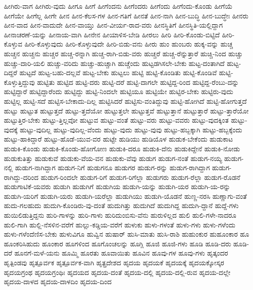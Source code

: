 {ಹೀಗಿರು-ವಾಗ
ಹೀಗಿರು-ವುದು
ಹೀಗೂ
ಹೀಗೆ
ಹೀಗೆಂದನು
ಹೀಗೆಂದರು
ಹೀಗೆಂದು
ಹೀಗೆಂದು-ಕೊಂಡು
ಹೀಗೆಯೆ
ಹೀಗೆಯೇ
ಹೀಗೆಲ್ಲ
ಹೀಗೇ
ಹೀನ
ಹೀನ-ಕೆಲಸ-ಗಳ
ಹೀನ-ಗತಿಗೆ
ಹೀನತೆ
ಹೀನ-ನಾಗಿ
ಹೀನ-ಬುದ್ಧಿ
ಹೀನ-ಬುದ್ಧೇಃ
ಹೀನರು
ಹೀನ-ವಾದ
ಹೀನ-ವಾದುದೇ
ಹೀನ-ವಾಯ್ತು
ಹೀನ-ವೀರ್ಯ-ರಾದ-ವರು
ಹೀನಸ್ಥಿತಿಗೆ
ಹೀನಸ್ಥಿತಿ-ಯಲ್ಲಿದ್ದಾಗ
ಹೀನಾಚರಣೆ-ಯನ್ನು
ಹೀನಾಯ-ವಾಗಿ
ಹೀನೇನ
ಹೀಯಾಳಿಸ-ಬೇಡಿ
ಹೀರಲು
ಹೀರಿ
ಹೀರಿ-ಕೊಂಡು-ಬಿಟ್ಟಿದೆ
ಹೀರಿ-ಕೊಳ್ಳುವ
ಹೀರಿ-ಕೊಳ್ಳುವುದು
ಹೀರಿ-ಕೊಳ್ಳುವುದೇ
ಹೀರಿ-ಬಿಡು-ವನು
ಹೀರು
ಹುಂ
ಹುಂಬರು
ಹುಕ್ಕ-ವನ್ನು
ಹುಚ್ಚ
ಹುಚ್ಚನ
ಹುಚ್ಚನು
ಹುಚ್ಚರ
ಹುಚ್ಚ-ರನ್ನಾಗಿ
ಹುಚ್ಚ-ರಾಗಿ-ಬಿಡು-ವರು
ಹುಚ್ಚರೆ
ಹುಚ್ಚ-ರೆನ್ನುತ್ತಾರೆ
ಹುಚ್ಚಿ-ನಿಂದ
ಹುಚ್ಚು
ಹುಚ್ಚು-ದಾರಿ-ಯಲಿ
ಹುಚ್ಚು-ವರಿದು
ಹುಚ್ಚು-ಹುಚ್ಚಾಗಿ
ಹುಚ್ಚೆಂದು
ಹುಟ್ಟಡಗಿಸಲೇ-ಬೇಕು
ಹುಟ್ಟ-ದಂತಾಗಿದೆ
ಹುಟ್ಟ-ದಿದ್ದರೆ
ಹುಟ್ಟದೆ
ಹುಟ್ಟ-ಬಹು-ದಲ್ಲವೆ
ಹುಟ್ಟ-ಬೇಕು
ಹುಟ್ಟಲು
ಹುಟ್ಟಿ
ಹುಟ್ಟಿ-ಕೊಂಡಿತು
ಹುಟ್ಟಿ-ಕೊಂಡಿವೆ
ಹುಟ್ಟಿ-ಕೊಳ್ಳುತ್ತಿದ್ದುವು
ಹುಟ್ಟಿತು
ಹುಟ್ಟಿದ
ಹುಟ್ಟಿ-ದರು
ಹುಟ್ಟಿ-ದರೆ
ಹುಟ್ಟಿ-ದಾಗಲೇ
ಹುಟ್ಟಿದ್ದ-ರಿಂದ
ಹುಟ್ಟಿದ್ದ-ರೆಂಬು-ದನ್ನು
ಹುಟ್ಟಿದ್ದಾರೆ
ಹುಟ್ಟಿದ್ದಾರೆಂದು
ಹುಟ್ಟಿದ್ದು
ಹುಟ್ಟಿ-ನಿಂದಲೇ
ಹುಟ್ಟಿಯೂ
ಹುಟ್ಟಿಯೇ
ಹುಟ್ಟಿರ-ಬೇಕು
ಹುಟ್ಟಿರು-ವುದು
ಹುಟ್ಟಿಲ್ಲ
ಹುಟ್ಟಿ-ಸದೆ
ಹುಟ್ಟಿಸ-ಬೇಕಾದು-ದಿಲ್ಲ
ಹುಟ್ಟಿಸಿದರೆ
ಹುಟ್ಟಿಸು-ವಂತಿದ್ದುವು
ಹುಟ್ಟಿ-ಹೋಗಿದೆ
ಹುಟ್ಟಿ-ಹೋಗುತ್ತದೆ
ಹುಟ್ಟು
ಹುಟ್ಟುತ
ಹುಟ್ಟುತ್ತದೆ
ಹುಟ್ಟು-ತ್ತದೆಯೋ
ಹುಟ್ಟುತ್ತಲೇ
ಹುಟ್ಟುತ್ತವೆ
ಹುಟ್ಟುತ್ತಾನೆ
ಹುಟ್ಟುತ್ತಾರೆ
ಹುಟ್ಟು-ತ್ತಾರೆಯೋ
ಹುಟ್ಟುತ್ತಿರ-ಬೇಕು
ಹುಟ್ಟು-ತ್ತಿಲ್ಲವೋ
ಹುಟ್ಟುವ
ಹುಟ್ಟು-ವಂತೆ
ಹುಟ್ಟು-ವರು
ಹುಟ್ಟು-ವವರು
ಹುಟ್ಟು-ವುದಕ್ಕಿಂತ
ಹುಟ್ಟು-ವುದಕ್ಕೆ
ಹುಟ್ಟು-ವುದಿಲ್ಲ
ಹುಟ್ಟು-ವುದಿಲ್ಲ-ವೆಂದು
ಹುಟ್ಟು-ವುದು
ಹುಟ್ಟು-ವುವು
ಹುಟ್ಟು-ಹಬ್ಬಕ್ಕಾಗಿ
ಹುಟ್ಟು-ಹಬ್ಬಕ್ಕೆಂದು
ಹುಟ್ಟು-ಹಾಕಿದ್ದಾರೆ
ಹುಟ್ಟು-ಹೊಡೆ-ಯುವ-ವರ
ಹುಟ್ಟೇ
ಹುಡಿಯು
ಹುಡಿಯೊಳ
ಹುಡುಕ-ಬೇಕೆಂದು
ಹುಡುಕಾಟ
ಹುಡುಕಿ-ಕೊಂಡು
ಹುಡುಕಿ-ಕೊಂಡು-ಹೋಗೋಣ
ಹುಡುಕಿ-ದರೂ
ಹುಡುಕಿ-ದೆನು
ಹುಡುಕಿದ್ದೇನೆ
ಹುಡುಕಿ-ನೋಡು
ಹುಡುಕುತಿತ್ತು
ಹುಡುಕುವೆ
ಹುಡುಕು-ವೆಯ-ವನ
ಹುಡುಕು-ವೆವು
ಹುಡುಗ
ಹುಡುಗ-ನಂತೆ
ಹುಡುಗ-ನಯ್ಯ
ಹುಡುಗ-ನಲ್ಲಿ
ಹುಡುಗ-ನಾಗಿದ್ದಾಗ
ಹುಡುಗ-ನಿಗೆ
ಹುಡುಗನೂ
ಹುಡುಗರ
ಹುಡುಗ-ರನ್ನು
ಹುಡುಗ-ರಾಗಿದ್ದಾಗ
ಹುಡುಗ-ರಾಗಿದ್ದು-ದರಿಂದ
ಹುಡುಗ-ರಿಂದಲೇ
ಹುಡುಗ-ರಿಗೆ
ಹುಡುಗ-ರಿಗೆಲ್ಲಾ
ಹುಡುಗರು
ಹುಡುಗ-ರೆಲ್ಲಾ
ಹುಡುಗ-ರೊಡನೆ
ಹುಡುಗಾಟಿಕೆ-ಯವರು
ಹುಡುಗಿ
ಹುಡುಗಿಗೆ
ಹುಡುಗಿಯ
ಹುಡುಗಿ-ಯನ್ನು
ಹುಡುಗಿ-ಯರ
ಹುಡುಗಿ-ಯ-ರನ್ನು
ಹುಡುಗಿ-ಯರಿಗೆ
ಹುಡುಗಿ-ಯರು
ಹುಡುಗಿ-ಯರೆಲ್ಲಾ
ಹುಡುಗಿಯು
ಹುಡುಗಿ-ಯೊಡನೆ
ಹುಣ್ಣ-ನರಸಿ
ಹುಣ್ಣಾಗು-ವಂತೆ
ಹುದು-ಗಲಹುದು
ಹುದುಗಿ-ಕೊಂಡಿರು-ವು-ದಂತೆ
ಹುದುಗಿತ್ತು
ಹುದುಗಿದೆ
ಹುದುಗಿದ್ದ
ಹುದುಗಿ-ದ್ದಾನೆ
ಹುದ್ದೆ-ಗಳು
ಹುಯಿಲಿಡುತ್ತಿದ್ದನು
ಹುರಿ-ಗಾಳನ್ನು
ಹುರಿ-ಗಾಳು
ಹುರಿದುಂಬಿಸು-ವೆನು
ಹುರುಳಿಲ್ಲದ
ಹುಲಿ
ಹುಲಿ-ಗಳೇ-ನಾದರೂ
ಹುಲಿ-ಗಾಗಿ
ಹುಲ್ಲಿ-ನೆಸಳಿನ-ವರೆಗೆ
ಹುಲ್ಲು-ಕಡ್ಡಿಯ-ವರೆಗೆ
ಹುಳುಕು
ಹುಳು-ಗಳಂತೆ
ಹುಳು-ಗಳು
ಹುಳು-ಗಳೆಂದು
ಹುಳು-ಗಳೆಂದೆಣಿಸ-ಬೇಕು
ಹುಳುವಿಗೂ
ಹುವ್ವಿನ
ಹುಷಾರ್
ಹುಸಿ-ಮಾತು
ಹುಸಿ-ರಾಶಿ
ಹುಹುಂಕುರ
ಹುಹೂಂಕಾರ
ಹೂ
ಹೂಂಕರಿಸಿಹುದು
ಹೂಂಕಾರ
ಹೂಗಳಿಂದ
ಹೂಗೊಂಚಲನ್ನು
ಹೂಗ್ಲಿ
ಹೂಜಿ
ಹೂಜಿ-ಗಳು
ಹೂಡಿ
ಹೂಡಿ-ದರು
ಹೂಡಿ-ದರೆ
ಹೂನಗೆ-ಮಳೆ-ಯನು
ಹೂಮ್ಮಿ
ಹೂರತು
ಹೂವಾಯಿತು
ಹೂವಿನ
ಹೂವು-ಗಳ
ಹೂವು-ಗಳು
ಹೃತ್ಕಂದರ
ಹೃತ್ಪಿಂಡವು
ಹೃತ್ಪೂರ್ವಕ
ಹೃತ್ಪೂರ್ವಕ-ವಾಗಿ
ಹೃತ್ಪ್ರದೇಶದ
ಹೃದಯ
ಹೃದಯಕೆ
ಹೃದಯಕ್ಕೆ
ಹೃದಯಕ್ಕೋಸ್ಕರ
ಹೃದಯಗ್ರಂಥ
ಹೃದಯಗ್ರಂಥಿಃ
ಹೃದಯದ
ಹೃದಯ-ದಂತೆ
ಹೃದಯ-ದಲ್ಲಿ
ಹೃದಯ-ದಲ್ಲಿ-ರುವ
ಹೃದಯ-ದಲ್ಲೇ
ಹೃದಯ-ದಾಳದ
ಹೃದಯ-ದಾಳದಿಂ
ಹೃದಯ-ದಿಂದ
}
